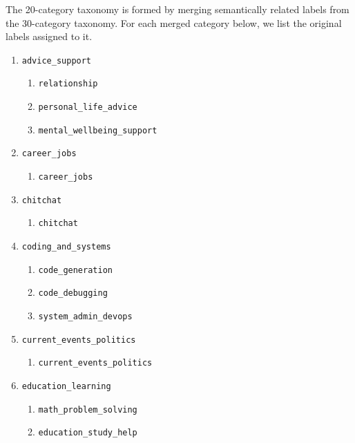 \documentclass{article}
\begin{document}
The 20-category taxonomy is formed by merging semantically related labels from the 30-category taxonomy. For each merged category below, we list the original labels assigned to it.

\begin{enumerate}
    \item \texttt{advice\_support}
    \begin{enumerate}
        \item \texttt{relationship}
        \item \texttt{personal\_life\_advice}
        \item \texttt{mental\_wellbeing\_support}
    \end{enumerate}

    \item \texttt{career\_jobs}
    \begin{enumerate}
        \item \texttt{career\_jobs}
    \end{enumerate}

    \item \texttt{chitchat}
    \begin{enumerate}
        \item \texttt{chitchat}
    \end{enumerate}

    \item \texttt{coding\_and\_systems}
    \begin{enumerate}
        \item \texttt{code\_generation}
        \item \texttt{code\_debugging}
        \item \texttt{system\_admin\_devops}
    \end{enumerate}

    \item \texttt{current\_events\_politics}
    \begin{enumerate}
        \item \texttt{current\_events\_politics}
    \end{enumerate}

    \item \texttt{education\_learning}
    \begin{enumerate}
        \item \texttt{math\_problem\_solving}
        \item \texttt{education\_study\_help}
    \end{enumerate}


\end{enumerate}
\end{document}

